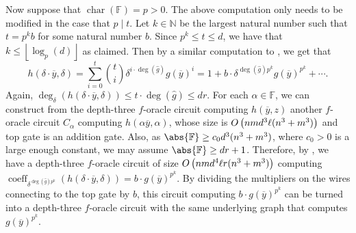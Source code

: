 \documentclass[10pt,a4paper]{amsart}
\DeclareMathOperator{\characteristic}{char}
\DeclareMathOperator{\coeff}{coeff}
\newcommand*\N{\mathbb{N}}
\newcommand*\F{\mathbb{F}}
\newcommand*\floor[1]{%
    \left\lfloor #1 \right\rfloor
}
\newcommand*\bigO[1]{%
    O\kern-0.0pt\left(#1\right)
}
\begin{document}
\begin{pf}
    Now suppose that $\characteristic(\F) = p > 0$.
    The above computation only needs to be modified in the case that $p \mid t$.
    Let $k \in \N$ be the largest natural number such that $t = p^k b$ for some natural number $b$.
    Since $p^k \leq t \leq d$, we have that $k \leq \floor{\log_p(d)}$ as claimed.
    Then by a similar computation to , we get that
    \begin{equation}\label{eq:det_computation_char_p} 
        h(\delta \cdot \overline{y}, \delta) = \sum_{i = 0}^t \binom{t}{i} \delta^{i \cdot \deg(\widehat{g})} g(\overline{y})^i = 1 + b \cdot \delta^{\deg(\widehat{g}) p^k} g(\overline{y})^{p^k} + \cdots.
    \end{equation}
    Again, $\deg_\delta(h(\delta \cdot \overline{y}, \delta)) \leq t \cdot \deg(\widehat{g}) \leq dr$.
    For each $\alpha \in \F$, we can construct from the depth-three $f$-oracle circuit computing $h(\overline{y},z)$ another $f$-oracle circuit $C_\alpha$ computing $h(\alpha \overline{y}, \alpha)$, whose size is $\bigO{nmd^3\ell(n^3+m^3)}$ and top gate is an addition gate.
    Also, as $\abs{\F} \geq c_0 d^3(n^3+m^3)$, where $c_0>0$ is a large enough constant, we may assume $\abs{\F} \geq dr+1$.
    Therefore, by , we have a depth-three $f$-oracle circuit of size $\bigO{nmd^4\ell r(n^3+m^3)}$ computing $\coeff_{\delta^{\deg(\widehat{g})p^k}}(h(\delta\cdot \overline{y},\delta))=b\cdot g(\overline{y})^{p^k}$.
    By dividing the multipliers on the wires connecting to the top gate by $b$, this circuit computing $b\cdot g(\overline{y})^{p^k}$ can be turned into a depth-three $f$-oracle circuit with the same underlying graph that computes $g(\overline{y})^{p^k}$.
\end{pf}
\end{document}
